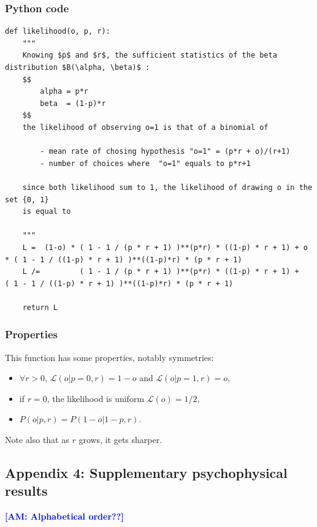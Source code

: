 \documentclass[12pt,english]{article}%
\newcommand{\Ll}{\mathcal{L}}
\newcommand{\seeApp}[1]{Appendix~\ref{app:#1}}
\newcommand{\AM}[1]{\textbf{\textcolor{blue}{[AM: #1]}}}
\begin{document}
\subsubsection{Python code}

\begin{lstlisting}
def likelihood(o, p, r):
    """
    Knowing $p$ and $r$, the sufficient statistics of the beta distribution $B(\alpha, \beta)$ :
    $$
        alpha = p*r
        beta  = (1-p)*r
    $$
    the likelihood of observing o=1 is that of a binomial of

        - mean rate of chosing hypothesis "o=1" = (p*r + o)/(r+1)
        - number of choices where  "o=1" equals to p*r+1

    since both likelihood sum to 1, the likelihood of drawing o in the set {0, 1}
    is equal to

    """
    L =  (1-o) * ( 1 - 1 / (p * r + 1) )**(p*r) * ((1-p) * r + 1) + o * ( 1 - 1 / ((1-p) * r + 1) )**((1-p)*r) * (p * r + 1)
    L /=         ( 1 - 1 / (p * r + 1) )**(p*r) * ((1-p) * r + 1) +     ( 1 - 1 / ((1-p) * r + 1) )**((1-p)*r) * (p * r + 1)

    return L
\end{lstlisting}

\subsubsection{Properties}
This function has some properties, notably symmetries:
	\begin{itemize}
		\item  $\forall r >0$, $\Ll(o|p=0, r)=1-o$ and $\Ll(o|p=1, r)=o$,
		\item if $r=0$, the likelihood is uniform $\Ll(o)=1/2$,
		\item $P(o | p, r)=P(1-o | 1-p, r)$.
	\end{itemize}

Note also that as $r$ grows, it gets sharper.


\subsection{Appendix 4: Supplementary psychophysical results}
\label{app:results_psycho}

\AM{Alphabetical order??}
{\tiny
\printbibliography
}
\end{document}
